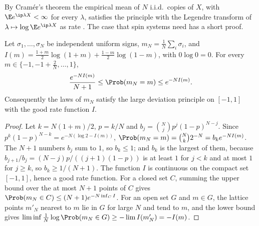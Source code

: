 \begin{refsection}
By Cramér's theorem the empirical mean of $N$ i.i.d.\ copies of $X$, with $\E e^{\ip\lambda X}<\infty$ for every $\lambda$, satisfies the principle with the Legendre transform of $\lambda\mapsto\log\E e^{\ip\lambda X}$ as rate \parencite[Chapter~2]{DemboZeitouni2010}. The case that spin systems need has a short proof.

\begin{lemma}\label{lem:toolkit:binomial}
Let $\sigma_1,\dots,\sigma_N$ be independent uniform signs, $m_N=\frac1N\sum_i\sigma_i$, and $I(m)=\frac{1+m}2\log(1+m)+\frac{1-m}2\log(1-m)$, with $0\log0=0$. For every $m\in\{-1,-1+\frac2N,\dots,1\}$,
\[
\frac{e^{-NI(m)}}{N+1}\le\Prob(m_N=m)\le e^{-NI(m)}.
\]
Consequently the laws of $m_N$ satisfy the large deviation principle on $[-1,1]$ with the good rate function $I$.
\end{lemma}

\begin{proof}
Let $k=N(1+m)/2$, $p=k/N$ and $b_j=\binom Njp^j(1-p)^{N-j}$. Since $p^k(1-p)^{N-k}=e^{-N(\log2-I(m))}$, $\Prob(m_N=m)=\binom Nk2^{-N}=b_ke^{-NI(m)}$. The $N+1$ numbers $b_j$ sum to $1$, so $b_k\le1$; and $b_k$ is the largest of them, because $b_{j+1}/b_j=(N-j)p/((j+1)(1-p))$ is at least $1$ for $j<k$ and at most $1$ for $j\ge k$, so $b_k\ge1/(N+1)$. The function $I$ is continuous on the compact set $[-1,1]$, hence a good rate function. For a closed set $C$, summing the upper bound over the at most $N+1$ points of $C$ gives $\Prob(m_N\in C)\le(N+1)e^{-N\inf_CI}$. For an open set $G$ and $m\in G$, the lattice points $m'_N$ nearest to $m$ lie in $G$ for large $N$ and tend to $m$, and the lower bound gives $\liminf\frac1N\log\Prob(m_N\in G)\ge-\lim I(m'_N)=-I(m)$.
\end{proof}


\end{refsection}
